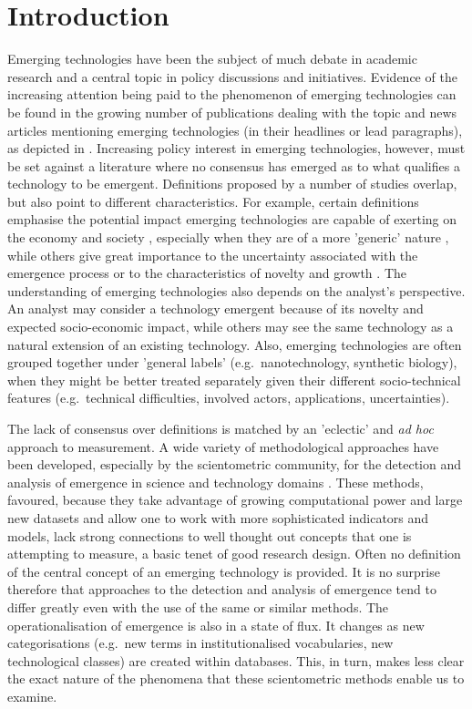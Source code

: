 \documentclass[11pt]{article}
\begin{document}
\section{Introduction}
Emerging technologies have been the subject of much debate in academic research and a central topic in policy discussions and initiatives. Evidence of the increasing attention being paid to the phenomenon of emerging technologies can be found in the growing number of publications dealing with the topic and news articles mentioning emerging technologies (in their headlines or lead paragraphs), as depicted in . Increasing policy interest in emerging technologies, however, must be set against a literature where no consensus has emerged as to what qualifies a technology to be emergent. Definitions proposed by a number of studies overlap, but also point to different characteristics. For example, certain definitions emphasise the potential impact emerging technologies are capable of exerting on the economy and society \citep[e.g.][]{Porter2002}, especially when they are of a more 'generic' nature \citep{Martin1995}, while others give great importance to the uncertainty associated with the emergence process \citep[e.g.][]{Boon2008} or to the characteristics of novelty and growth \citep[e.g.][]{Small2014}. The understanding of emerging technologies also depends on the analyst's perspective. An analyst may consider a technology emergent because of its novelty and expected socio-economic impact, while others may see the same technology as a natural extension of an existing technology. Also, emerging technologies are often grouped together under 'general labels' (e.g.\ nanotechnology, synthetic biology), when they might be better treated separately given their different socio-technical features (e.g.\ technical difficulties, involved actors, applications, uncertainties).

The lack of consensus over definitions is matched by an 'eclectic' and \textit{ad hoc} approach to measurement.  A wide variety of methodological approaches have been developed, especially by the scientometric community, for the detection and analysis of emergence in science and technology domains \citep[e.g.][]{Porter1995, Boyack2014, Glanzel2012}. These methods, favoured, because they take advantage of growing computational power and large new datasets and allow one to work with more sophisticated indicators and models, lack strong connections to well thought out concepts that one is attempting to measure, a basic tenet of good research design. Often no definition of the central concept of an emerging technology is provided. It is no surprise therefore that approaches to the detection and analysis of emergence tend to differ greatly even with the use of the same or similar methods. The operationalisation of emergence is also in a state of flux. It changes as new categorisations (e.g.\ new terms in institutionalised vocabularies, new technological classes) are created within databases. This, in turn, makes less clear the exact nature of the phenomena that these scientometric methods enable us to examine. 
\end{document}
